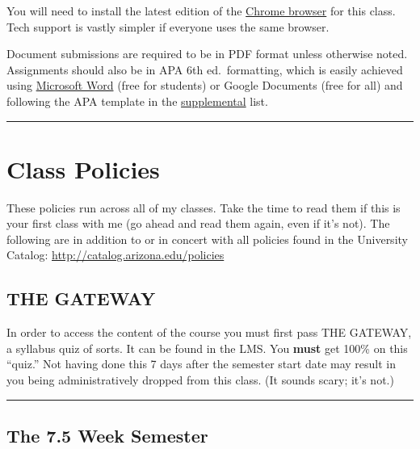 \documentclass[]{article}
\begin{document}
You will need to install the latest edition of the
\href{https://www.google.com/chrome/browser/}{Chrome browser} for this
class. Tech support is vastly simpler if everyone uses the same browser.

Document submissions are required to be in PDF format unless otherwise
noted. Assignments should also be in APA 6th ed.~formatting, which is
easily achieved using
\href{http://uabookstore.arizona.edu/technology/campuslicensing/default.asp}{Microsoft
Word} (free for students) or Google Documents (free for all) and
following the APA template in the \href{supplemental.html}{supplemental}
list.

\begin{center}\rule{0.5\linewidth}{\linethickness}\end{center}

\hypertarget{class-policies}{%
\section{Class Policies}\label{class-policies}}

These policies run across all of my classes. Take the time to read them
if this is your first class with me (go ahead and read them again, even
if it's not). The following are in addition to or in concert with all
policies found in the University Catalog:
\url{http://catalog.arizona.edu/policies}

\hypertarget{the-gateway}{%
\subsection{THE GATEWAY}\label{the-gateway}}

In order to access the content of the course you must first pass THE
GATEWAY, a syllabus quiz of sorts. It can be found in the LMS. You
\textbf{must} get 100\% on this ``quiz.'' Not having done this 7 days
after the semester start date may result in you being administratively
dropped from this class. (It sounds scary; it's not.)

\begin{center}\rule{0.5\linewidth}{\linethickness}\end{center}

\hypertarget{the-7.5-week-semester}{%
\subsection{The 7.5 Week Semester}\label{the-7.5-week-semester}}
\end{document}
